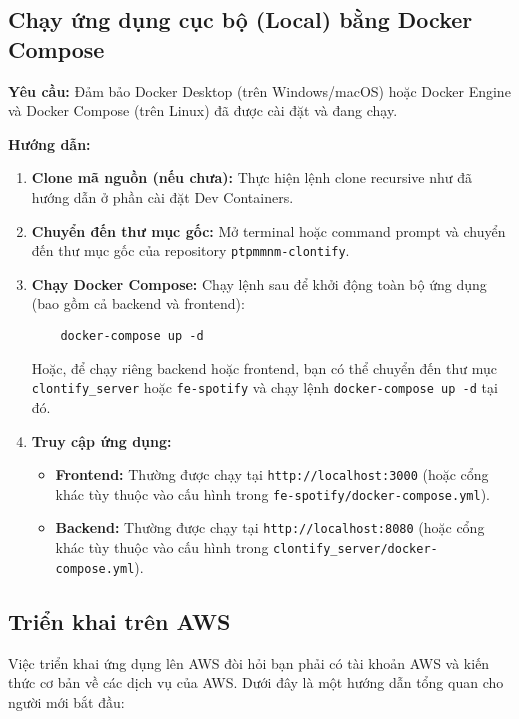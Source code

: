 \subsection{Chạy ứng dụng cục bộ (Local) bằng Docker Compose}
\label{subsec:local_deployment}

\textbf{Yêu cầu:} Đảm bảo Docker Desktop (trên Windows/macOS) hoặc Docker Engine và Docker Compose (trên Linux) đã được cài đặt và đang chạy.

\textbf{Hướng dẫn:}
\begin{enumerate}
    \item \textbf{Clone mã nguồn (nếu chưa):} Thực hiện lệnh clone recursive như đã hướng dẫn ở phần cài đặt Dev Containers.
    \item \textbf{Chuyển đến thư mục gốc:} Mở terminal hoặc command prompt và chuyển đến thư mục gốc của repository \texttt{ptpmmnm-clontify}.
    \item \textbf{Chạy Docker Compose:} Chạy lệnh sau để khởi động toàn bộ ứng dụng (bao gồm cả backend và frontend):
    \begin{verbatim}
    docker-compose up -d
    \end{verbatim}
    Hoặc, để chạy riêng backend hoặc frontend, bạn có thể chuyển đến thư mục \texttt{clontify\_server} hoặc \texttt{fe-spotify} và chạy lệnh \texttt{docker-compose up -d} tại đó.
    \item \textbf{Truy cập ứng dụng:}
    \begin{itemize}
        \item \textbf{Frontend:} Thường được chạy tại \texttt{http://localhost:3000} (hoặc cổng khác tùy thuộc vào cấu hình trong \texttt{fe-spotify/docker-compose.yml}).
        \item \textbf{Backend:} Thường được chạy tại \texttt{http://localhost:8080} (hoặc cổng khác tùy thuộc vào cấu hình trong \texttt{clontify\_server/docker-compose.yml}).
    \end{itemize}
\end{enumerate}

\subsection{Triển khai trên AWS}
\label{subsec:aws_deployment}

Việc triển khai ứng dụng lên AWS đòi hỏi bạn phải có tài khoản AWS và kiến thức cơ bản về các dịch vụ của AWS. Dưới đây là một hướng dẫn tổng quan cho người mới bắt đầu:

